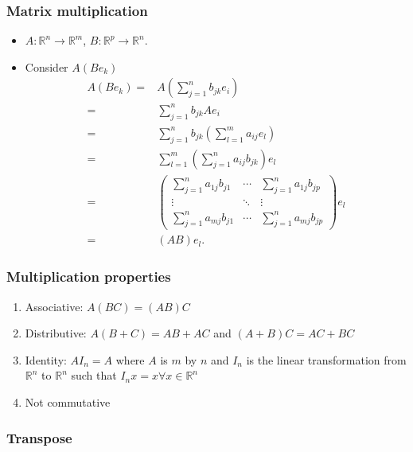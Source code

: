\documentclass[compress]{beamer}
\def\R{\mathbb{R}}
\theoremstyle{definition}
\begin{document}
\begin{frame}
  \frametitle{Matrix multiplication}
  \begin{itemize}
  \item $A: \R^n \rightarrow \R^m$, $B:\R^p \rightarrow \R^n$.
  \item Consider $A(B e_k)$
    \begin{align*}
      A(B e_k) = & A (\sum_{j=1}^n b_{jk} e_i) \\
      = & \sum_{j=1}^n b_{jk} A e_i \\
      = & \sum_{j=1}^n b_{jk} \left(\sum_{l=1}^m a_{ij} e_l\right)  \\
      = & \sum_{l=1}^m \left(\sum_{j=1}^n a_{ij} b_{jk} \right) e_l \\
      = & \begin{pmatrix} 
        \sum_{j=1}^n a_{1j} b_{j1} & \cdots & \sum_{j=1}^n a_{1j} b_{jp} \\
        \vdots & \ddots & \vdots \\
        \sum_{j=1}^n a_{mj} b_{j1} & \cdots & \sum_{j=1}^n a_{mj} b_{jp}
      \end{pmatrix} e_l \\
      = & (AB) e_l.
    \end{align*}
  \end{itemize}
\end{frame}

\begin{frame}
  \frametitle{Multiplication properties}
  \begin{enumerate}
  \item Associative: $A(BC) = (AB) C$
  \item Distributive: $A(B+C) = AB + AC$ and $(A+B)C = AC + BC$
  \item Identity: $AI_n = A$ where $A$ is $m$ by $n$ and $I_n$ is the
    linear transformation from $\R^n$ to $\R^n$ such that $I_nx = x
    \forall x \in \R^n$
  \item Not commutative
  \end{enumerate}
\end{frame}

\subsubsection{Transpose}
\end{document}
